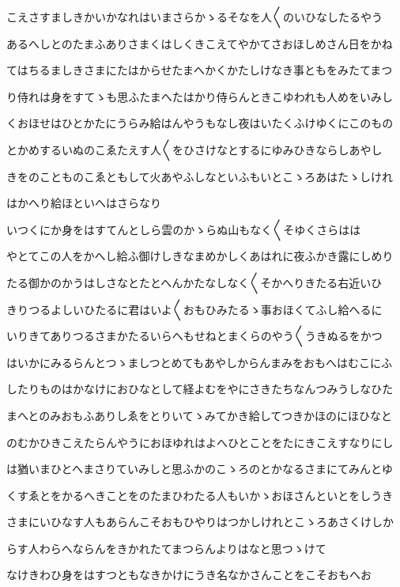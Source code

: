 \documentclass[a4paper,11pt,landscape]{ltjtarticle}
\begin{document}
\par\medskip
こえさすましきかいかなれはいまさらかゝるそなを人〱のいひなしたるやう
\par\medskip
あるへしとのたまふありさまくはしくきこえてやかてさおほしめさん日をかね
\par\medskip
てはちるましきさまにたはからせたまへかくかたしけなき事ともをみたてまつ
\par\medskip
り侍れは身をすてゝも思ふたまへたはかり侍らんときこゆわれも人めをいみし
\par\medskip
くおほせはひとかたにうらみ給はんやうもなし夜はいたくふけゆくにこのもの
\par\medskip
とかめするいぬのこゑたえす人〱をひさけなとするにゆみひきならしあやし
\par\medskip
きをのことものこゑともして火あやふしなといふもいとこゝろあはたゝしけれ
\par\medskip
はかへり給ほといへはさらなり
\par\medskip
いつくにか身をはすてんとしら雲のかゝらぬ山もなく〱そゆくさらはは
\par\medskip
やとてこの人をかへし給ふ御けしきなまめかしくあはれに夜ふかき露にしめり
\par\medskip
たる御かのかうはしさなとたとへんかたなしなく〱そかへりきたる右近いひ
\par\medskip
きりつるよしいひたるに君はいよ〱おもひみたるゝ事おほくてふし給へるに
\par\medskip
いりきてありつるさまかたるいらへもせねとまくらのやう〱うきぬるをかつ
\par\medskip
はいかにみるらんとつゝましつとめてもあやしからんまみをおもへはむこにふ
\par\medskip
したりものはかなけにおひなとして経よむをやにさきたちなんつみうしなひた
\par\medskip
まへとのみおもふありしゑをとりいてゝみてかき給してつきかほのにほひなと
\par\medskip
のむかひきこえたらんやうにおほゆれはよへひとことをたにきこえすなりにし
\par\medskip
は猶いまひとへまさりていみしと思ふかのこゝろのとかなるさまにてみんとゆ
\par\medskip
くすゑとをかるへきことをのたまひわたる人もいかゝおほさんといとをしうき
\par\medskip
さまにいひなす人もあらんこそおもひやりはつかしけれとこゝろあさくけしか
\par\medskip
らす人わらへならんをきかれたてまつらんよりはなと思つゝけて
\par\medskip
なけきわひ身をはすつともなきかけにうき名なかさんことをこそおもへお
\end{document}
